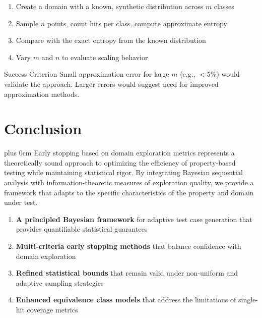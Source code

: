 \documentclass[11pt,a4paper]{article}
\newcommand{\justifytext}{\leftskip=0pt \rightskip=0pt plus 0cm}
\begin{document}
\begin{tcolorbox}[
  colback=blue!5!white,
  colframe=blue!75!black,
  title=Experimental Design,
  fonttitle=\bfseries
]
\begin{enumerate}
\item Create a domain with a known, synthetic distribution across $m$ classes
\item Sample $n$ points, count hits per class, compute approximate entropy
\item Compare with the exact entropy from the known distribution
\item Vary $m$ and $n$ to evaluate scaling behavior
\end{enumerate}
\end{tcolorbox}

\begin{definitionbox}{Success Criterion}
Small approximation error for large $m$ (e.g., $<$5\%) would validate the approach. Larger errors would suggest need for improved approximation methods.
\end{definitionbox}

\section{Conclusion}

\justifytext
Early stopping based on domain exploration metrics represents a theoretically sound approach to optimizing the efficiency of property-based testing while maintaining statistical rigor. By integrating Bayesian sequential analysis with information-theoretic measures of exploration quality, we provide a framework that adapts to the specific characteristics of the property and domain under test.

\begin{tcolorbox}[
  colback=green!5!white,
  colframe=green!75!black,
  title=Key Contributions,
  fonttitle=\bfseries
]
\begin{enumerate}
\item \textbf{A principled Bayesian framework} for adaptive test case generation that provides quantifiable statistical guarantees
\item \textbf{Multi-criteria early stopping methods} that balance confidence with domain exploration
\item \textbf{Refined statistical bounds} that remain valid under non-uniform and adaptive sampling strategies
\item \textbf{Enhanced equivalence class models} that address the limitations of single-hit coverage metrics
\end{enumerate}
\end{tcolorbox}
\end{document}
